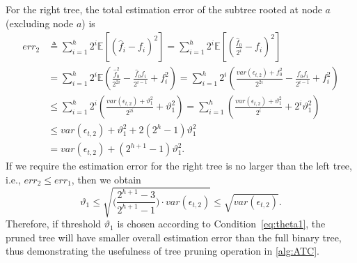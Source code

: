 \documentclass[acmsmall]{acmart}
\newcommand{\E}{\mathbb{E}}
\newcommand{\err}{\mathit{err}}
\newcommand{\var}{\mathit{var}}
\begin{document}
For the right tree, the total estimation error of the subtree rooted at node $a$
(excluding node $a$) is
\begin{align*}
  \err_2
  &\triangleq \sum_{i=1}^h 2^i\E[(\hat{f}_i-f_i)^2]
    = \sum_{i=1}^h 2^i\E[(\frac{\hat{f}_0}{2^i}-f_i)^2] \\
  &= \sum_{i=1}^h 2^i\E( \frac{\hat{f}_0^2}{2^{2i}} - \frac{\hat{f}_0f_i}{2^{i-1}}
    +f_i^2 )
  = \sum_{i=1}^h 2^i(\frac{\var(\epsilon_{t,2}) + f_0^2}{2^{2i}}
    - \frac{f_0f_i}{2^{i-1}} + f_i^2) \\
  &\leq \sum_{i=1}^h 2^i(\frac{\var(\epsilon_{t,2})+\vartheta_1^2}{2^{2i}}+\vartheta_1^2)
    = \sum_{i=1}^h(\frac{\var(\epsilon_{t,2})+\vartheta_1^2}{2^i} + 2^i\vartheta_1^2) \\
  &\leq \var(\epsilon_{t,2}) + \vartheta_1^2 + 2(2^h-1)\vartheta_1^2 \\
  &= \var(\epsilon_{t,2}) + (2^{h+1}-1)\vartheta_1^2.
\end{align*}
If we require the estimation error for the right tree is no larger than the left
tree, i.e., $\err_2\le \err_1$, then we obtain
\begin{equation}\label{eq:theta1}
  \vartheta_1
  \leq \sqrt{\big(\frac{2^{h+1}-3}{2^{h+1}-1}\big)\cdot\var(\epsilon_{t,2})}
  \leq \sqrt{\var(\epsilon_{t,2})}.
\end{equation}
Therefore, if threshold $\vartheta_1$ is chosen according to
Condition~\eqref{eq:theta1}, the pruned tree will have smaller overall
estimation error than the full binary tree, thus demonstrating the usefulness of
tree pruning operation in \cref{alg:ATC}.
\end{document}
